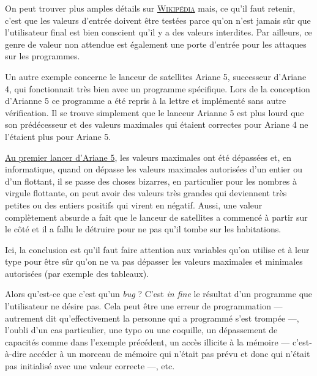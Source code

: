 On peut trouver plus amples détails sur \href{https://en.wikipedia.org/wiki/USS_Yorktown_(CG-48)}{\textsc{Wikipédia}} mais, ce qu'il faut retenir, c'est que les valeurs d'entrée doivent être testées parce qu'on n'est jamais sûr que l'utilisateur final est bien conscient qu'il y a des valeurs interdites. Par ailleurs, ce genre de valeur non attendue est également une porte d'entrée pour les attaques sur les programmes. 

%
Un autre exemple concerne le lanceur de satellites Ariane 5, successeur d'Ariane 4, qui fonctionnait très bien avec un programme spécifique. Lors de la conception d'Arianne 5 ce programme a été repris à la lettre et implémenté sans autre vérification. Il se trouve simplement que le lanceur Arianne 5 est plus lourd que son prédécesseur et des valeurs maximales qui étaient correctes pour Ariane 4 ne l'étaient plus pour Ariane 5.

\href{https://fr.wikipedia.org/wiki/Vol_501_d\%27Ariane_5}{Au premier lancer d'Ariane 5}, les valeurs maximales ont été dépassées et, en informatique, quand on dépasse les valeurs maximales autorisées d'un entier ou d'un flottant, il se passe des choses bizarres, en particulier pour les nombres à virgule flottante, on peut avoir des valeurs très grandes qui deviennent très petites ou des entiers positifs qui virent en négatif. Aussi, une valeur complètement absurde a fait que le lanceur de satellites a commencé à partir sur le côté et il a fallu le détruire pour ne pas qu'il tombe sur les habitations. 

\pagebreak

%
Ici, la conclusion est qu'il faut faire attention aux variables qu'on utilise et à leur type pour être sûr qu'on ne va pas dépasser les valeurs maximales et minimales autorisées (par exemple des tableaux). 

Alors qu'est-ce que c'est qu'un \textit{bug} ? C'est \textit{in fine} le résultat d'un programme que l'utilisateur ne désire pas. Cela peut être une erreur de programmation --- autrement dit qu'effectivement la personne qui a programmé s'est trompée ---, l'oubli d'un cas particulier, une typo ou une coquille, un dépassement de capacités comme dans l'exemple précédent, un accès illicite à la mémoire --- c'est-à-dire accéder à un morceau de mémoire qui n'était pas prévu et donc qui n'était pas initialisé avec une valeur correcte ---, etc.

